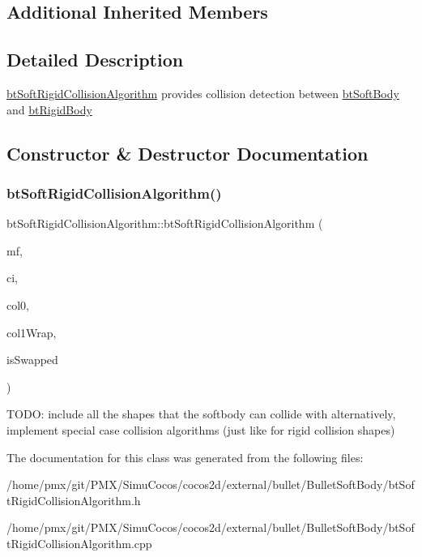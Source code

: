 \subsection*{Additional Inherited Members}


\subsection{Detailed Description}
\hyperlink{classbtSoftRigidCollisionAlgorithm}{bt\+Soft\+Rigid\+Collision\+Algorithm} provides collision detection between \hyperlink{classbtSoftBody}{bt\+Soft\+Body} and \hyperlink{classbtRigidBody}{bt\+Rigid\+Body} 

\subsection{Constructor \& Destructor Documentation}
\mbox{\label{classbtSoftRigidCollisionAlgorithm_aa6f289e315d626acf0a47ba093f6d4eb}} 
\subsubsection{\texorpdfstring{bt\+Soft\+Rigid\+Collision\+Algorithm()}{btSoftRigidCollisionAlgorithm()}}
{\footnotesize\ttfamily bt\+Soft\+Rigid\+Collision\+Algorithm\+::bt\+Soft\+Rigid\+Collision\+Algorithm (\begin{DoxyParamCaption}\item[{bt\+Persistent\+Manifold $\ast$}]{mf,  }\item[{const \hyperlink{structbtCollisionAlgorithmConstructionInfo}{bt\+Collision\+Algorithm\+Construction\+Info} \&}]{ci,  }\item[{const \hyperlink{structbtCollisionObjectWrapper}{bt\+Collision\+Object\+Wrapper} $\ast$}]{col0,  }\item[{const \hyperlink{structbtCollisionObjectWrapper}{bt\+Collision\+Object\+Wrapper} $\ast$}]{col1\+Wrap,  }\item[{bool}]{is\+Swapped }\end{DoxyParamCaption})}

T\+O\+DO\+: include all the shapes that the softbody can collide with alternatively, implement special case collision algorithms (just like for rigid collision shapes) 

The documentation for this class was generated from the following files\+:\begin{DoxyCompactItemize}
\item 
/home/pmx/git/\+P\+M\+X/\+Simu\+Cocos/cocos2d/external/bullet/\+Bullet\+Soft\+Body/bt\+Soft\+Rigid\+Collision\+Algorithm.\+h\item 
/home/pmx/git/\+P\+M\+X/\+Simu\+Cocos/cocos2d/external/bullet/\+Bullet\+Soft\+Body/bt\+Soft\+Rigid\+Collision\+Algorithm.\+cpp\end{DoxyCompactItemize}
